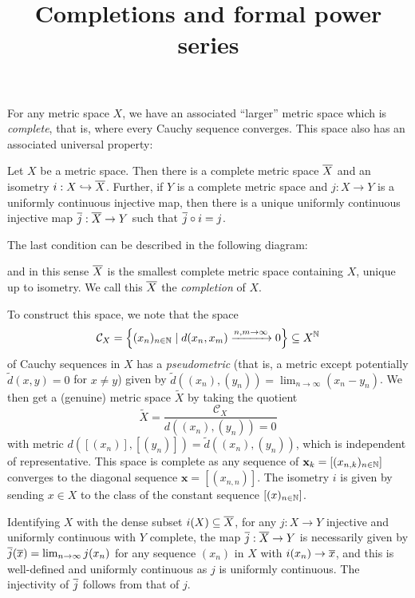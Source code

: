 \documentclass[11pt]{article}
\title{Completions and formal power series}
\renewcommand{\x}{\mathbf{x}}
\begin{document}
\maketitle
For any metric space $X$, we have an associated ``larger'' metric space which is \emph{complete}, that is, where every Cauchy sequence converges. This space also has an associated universal property:
\begin{theorem}
    Let $X$ be a metric space. Then there is a complete metric space $\overline{X}$ and an isometry $i : X \hookrightarrow \overline{X}$. Further, if $Y$ is a complete metric space and $j : X \to Y$ is a uniformly continuous injective map, then there is a unique uniformly continuous injective map $\overline{j} : \overline{X} \to Y$ such that $\overline{j} \circ i = j$.
\end{theorem}
The last condition can be described in the following diagram:
\begin{center}
\end{center}
and in this sense $\overline{X}$ is the smallest complete metric space containing $X$, unique up to isometry. We call this $\overline{X}$ the \emph{completion} of $X$.

To construct this space, we note that the space 
$$
    \mathcal{C}_X = \left\{  (x_n)_{n \in \mathbb{N}} \mid d(x_n, x_m) \xrightarrow{n, m \to \infty} 0  \right\} \subseteq X^{\mathbb{N}}
$$
of Cauchy sequences in $X$ has a \emph{pseudometric} (that is, a metric except potentially $\tilde d(x, y) = 0$ for $x \neq y$) given by $\tilde d((x_n), (y_n)) = \lim_{n \to \infty}(x_n - y_n)$. We then get a (genuine) metric space $\tilde X$ by taking the quotient
$$
    \tilde X = \frac{\mathcal{C}_X}{d((x_n), (y_n)) = 0}
$$
with metric $d([(x_n)], [(y_n)]) = \tilde d((x_n), (y_n))$, which is independent of representative. This space is complete as any sequence of $\x_k = [(x_{n, k})_{n \in \N}]$ converges to the diagonal sequence $\x = [(x_{n, n})]$. The isometry $i$ is given by sending $x \in X$ to the class of the constant sequence $[(x)_{n \in \mathbb{N}}]$. 

Identifying $X$ with the dense subset $i(X) \subseteq \overline{X}$, for any $j : X \to Y$ injective and uniformly continuous with $Y$ complete, the map $\overline{j} : \overline{X} \to Y$ is necessarily given by $\overline{j}(\overline{x}) = \lim_{n \to \infty}j(x_n)$ for any sequence $(x_n)$ in $X$ with $i(x_n) \to \overline{x}$, and this is well-defined and uniformly continuous as $j$ is uniformly continuous. The injectivity of $\overline{j}$ follows from that of $j$.
\end{document}
